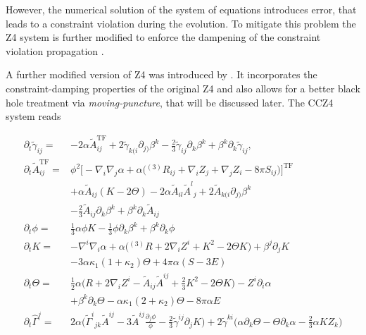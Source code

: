 {    However, the numerical solution of the system of equations introduces error, that leads to a constraint violation during the evolution. 
    To mitigate this problem the Z4 system is further modified to enforce the dampening of the constraint violation propagation \cite{Gundlach:2005eh}.
    
    A further modified version of Z4 was introduced by \cite{Alic:2011gg}. 
    It incorporates the constraint-damping properties of the original Z4 and also allows for a better black hole treatment via \textit{moving-puncture}, that will be discussed later. 
    The CCZ4 system reads 
    
    \begin{align}
        \partial_{t}\widetilde{\gamma}_{ij} = & -2\alpha\widetilde{A}_{ij}^{\text{TF}} + 2\widetilde{\gamma}_{k(i}\partial_{j)}\beta^k - \frac{2}{3}\widetilde{\gamma}_{ij}\partial_k \beta^k + \beta^k\partial_k\widetilde{\gamma}_{ij}, \\
        \partial_{t}\widetilde{A}_{ij}^{\text{TF}} = & \phi^2\big[-\nabla_i\nabla_j\alpha + \alpha\big({^{(3)}R}_{ij}+\nabla_{i}Z_{j} + \nabla_{j}Z_{i}- 8\pi S_{ij}\big)\big]^{\text{TF}} \\
        & + \alpha\widetilde{A}_{ij}(K-2\Theta)-2\alpha\widetilde{A}_{il}{\widetilde{A}^l}_{j} + 2\widetilde{A}_{k(i}\partial_{j)}\beta^{k} \\
        & -\frac{2}{3}\widetilde{A}_{ij}\partial_{k}\beta^{k} + \beta^{k}\partial_{k}\widetilde{A}_{ij} \\
        \partial_{t} \phi = & \frac{1}{3}\alpha\phi K - \frac{1}{3}\phi\partial_{k}\beta^{k} + \beta^{k}\partial_{k}\phi \\
        \partial_{t}K = &-\nabla^{i}\nabla_{i}\alpha + \alpha\big({^{(3)}R} + 2\nabla_{i}Z^{i} + K^2 - 2\Theta K\big) + \beta^{j}\partial_{j}K \\
        & - 3\alpha\kappa_1(1+\kappa_2)\Theta + 4\pi\alpha (S-3E) \\
        \partial_{t}\Theta = &\frac{1}{2}\alpha\Big(R + 2\nabla_{i}Z^{i} - \widetilde{A}_{ij}\widetilde{A}^{ij} + \frac{2}{3}K^2 - 2\Theta K\Big) - Z^{i}\partial_{i}\alpha \\
        & + \beta^{k}\partial_{k}\Theta - \alpha\kappa_1(2 + \kappa_2)\Theta - 8\pi\alpha E \\
        \partial_{t}\hat{\Gamma}^j = & 2\alpha\Bigg({\widetilde{\Gamma}^i}_{jk}\widetilde{A}^{ij} - 	3\widetilde{A}^{ij}\frac{\partial_{j}\phi}{\phi} -\frac{2}{3}\widetilde{\gamma}^{ij}\partial_{j}K\Bigg) + 2\widetilde{\gamma}^{ki}\Big(\alpha\partial_{k}\Theta - \Theta\partial_{k}\alpha - \frac{2}{3}\alpha K Z_{k}\Big) \\

\end{align}}
